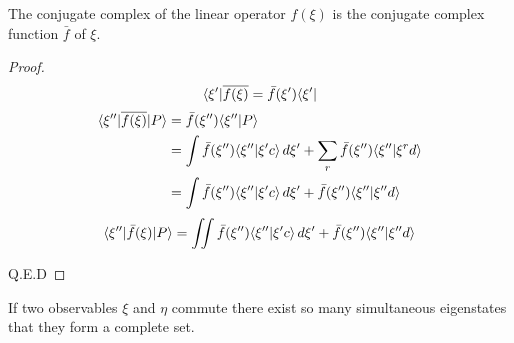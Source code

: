 \begin{theorem}
The conjugate complex of the linear operator $f(\xi)$ is the conjugate complex function $\bar{f}$ of $\xi$.
\end{theorem}
\begin{proof}
\begin{equation}
\langle \xi' |\overline{f(\xi)} = \bar{f}(\xi')\langle \xi' |
\end{equation}
\begin{align*}
\langle \xi'' | \overline{f(\xi)} | P \rangle &= \bar{f} (\xi'')\langle \xi'' | P \rangle \\
&= \int \bar{f}(\xi'') \langle \xi'' | \xi'c \rangle \, d\xi' + \sum_r \bar{f} (\xi'') \langle \xi'' | \xi^r d \rangle\\
&= \int \bar{f}(\xi'') \langle \xi'' | \xi'c \rangle \, d\xi' + \bar{f} (\xi'') \langle \xi'' | \xi'' d \rangle
\end{align*}
\begin{equation}
\langle \xi'' | \bar{f}(\xi) | P \rangle = \iint \bar{f} (\xi'') \langle \xi'' | \xi'c \rangle \, d\xi' + \bar{f} (\xi'') \langle \xi'' | \xi''d \rangle
\end{equation}

Q.E.D
\end{proof}

\begin{theorem}
If two observables $\xi$ and $\eta$ commute there exist so many simultaneous eigenstates that they form a complete set.
\end{theorem}

